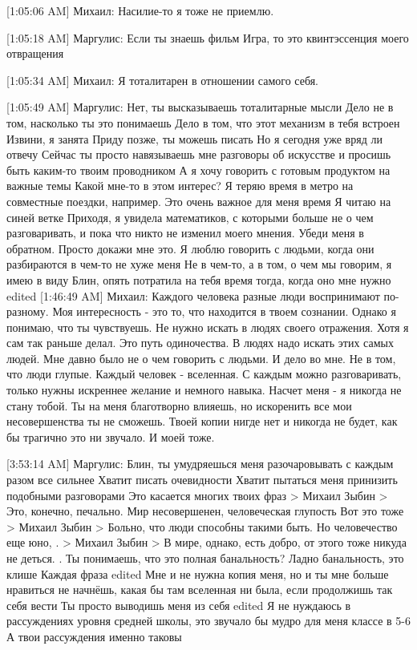 \documentclass{article}
\begin{document}
[1:05:06 AM] Михаил:
Насилие-то я тоже не приемлю.

[1:05:18 AM] Маргулис:
Если ты знаешь фильм Игра, то это квинтэссенция моего отвращения

[1:05:34 AM] Михаил:
Я тоталитарен в отношении самого себя.

[1:05:49 AM] Маргулис:
Нет, ты высказываешь тоталитарные мысли
 Дело не в том, насколько ты это понимаешь
 Дело в том, что этот механизм в тебя встроен
 Извини, я занята
 Приду позже, ты можешь писать
 Но я сегодня уже вряд ли отвечу
 Сейчас ты просто навязываешь мне разговоры об искусстве и просишь быть каким-то твоим проводником
 А я хочу говорить с готовым продуктом на важные темы
 Какой мне-то в этом интерес? Я теряю время в метро на совместные поездки, например. Это очень важное для меня время
 Я читаю на синей ветке
 Приходя, я увидела математиков, с которыми больше не о чем разговаривать, и пока что никто не изменил моего мнения. Убеди меня в обратном. Просто докажи мне это.
 Я люблю говорить с людьми, когда они разбираются в чем-то не хуже меня
 Не в чем-то, а в том, о чем мы говорим, я имею в виду
 Блин, опять потратила на тебя время тогда, когда оно мне нужно
edited 
[1:46:49 AM] Михаил:
Каждого человека разные люди воспринимают по-разному. Моя интересность - это то, что находится в твоем сознании.
 Однако я понимаю, что ты чувствуешь.
 Не нужно искать в людях своего отражения. Хотя я сам так раньше делал. Это путь одиночества. В людях надо искать этих самых людей.
 Мне давно было не о чем говорить с людьми. И дело во мне. Не в том, что люди глупые. Каждый человек - вселенная. С каждым можно разговаривать, только нужны искреннее желание и немного навыка.
 Насчет меня - я никогда не стану тобой. Ты на меня благотворно влияешь, но искоренить все мои несовершенства ты не сможешь. Твоей копии нигде нет и никогда не будет, как бы трагично это ни звучало. И моей тоже.

[3:53:14 AM] Маргулис:
Блин, ты умудряешься меня разочаровывать с каждым разом все сильнее
 Хватит писать очевидности
 Хватит пытаться меня принизить подобными разговорами
 Это касается многих твоих фраз
> Михаил Зыбин
> Это, конечно, печально. Мир несовершенен, человеческая глупость
Вот это тоже
> Михаил Зыбин
> Больно, что люди способны такими быть. Но человечество еще юно,
.
> Михаил Зыбин
> В мире, однако, есть добро, от этого тоже никуда не деться.
.
 Ты понимаешь, что это полная банальность?
 Ладно банальность, это клише
 Каждая фраза
edited 
Мне и не нужна копия меня, но и ты мне больше нравиться не начнёшь, какая бы там вселенная ни была, если продолжишь так себя вести
 Ты просто выводишь меня из себя
edited 
Я не нуждаюсь в рассуждениях уровня средней школы, это звучало бы мудро для меня классе в 5-6
 А твои рассуждения именно таковы
\end{document}

